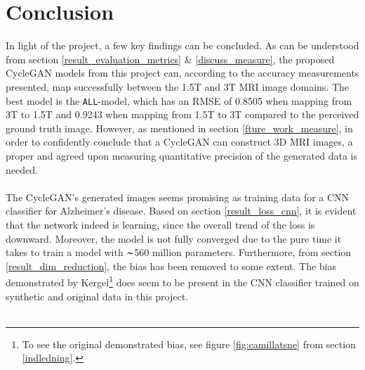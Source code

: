 \documentclass[11pt, fleqn, titlepage]{article}
\newcommand{\1}[1]{\mathds{1}\left[#1\right]}
\begin{document}
\section{Conclusion}\label{conclusion}

In light of the project, a few key findings can be concluded. As can be understood from section \ref{result_evaluation_metrics} \& \ref{discuss_measure}, the proposed CycleGAN models from this project can, according to the accuracy measurements presented, map successfully between the 1.5T and 3T MRI image domains. The best model is the \texttt{ALL}-model, which has an RMSE of 0.8505 when mapping from 3T to 1.5T and 0.9243 when mapping from 1.5T to 3T compared to the perceived ground truth image. However, as mentioned in section \ref{fture_work_measure}, in order to confidently conclude that a CycleGAN can construct 3D MRI images, a proper and agreed upon measuring quantitative precision of the generated data is needed. 
\\\\
%
The CycleGAN's generated images seems promising as training data for a CNN classifier for Alzheimer's disease. Based on section \ref{result_loss_cnn}, it is evident that the network indeed is learning, since the overall trend of the loss is downward. Moreover, the model is not fully converged due to the pure time it takes to train a model with  $ \thicksim $560 million parameters. Furthermore, from section \ref{result_dim_reduction}, the bias has been removed to some extent. The bias demonstrated by Kergel\footnote{To see the original demonstrated bias, see figure \ref{fig:camillatsne} from section \ref{indledning}.} does seem to be present in the CNN classifier trained on synthetic and original data in this project. 
\\\\
\end{document}
